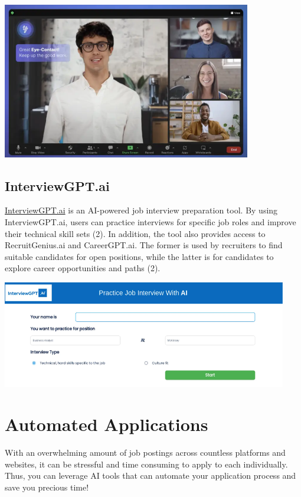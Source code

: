 \documentclass[
]{book}
\begin{document}
\includegraphics[width=4.28125in,height=\textheight]{yoodli pic 2.png}

\hypertarget{interviewgpt.ai}{%
\section{InterviewGPT.ai}\label{interviewgpt.ai}}

\href{https://interviewgpt.ai/}{InterviewGPT.ai} is an AI-powered job interview preparation tool. By using InterviewGPT.ai, users can practice interviews for specific job roles and improve their technical skill sets (2). In addition, the tool also provides access to RecruitGenius.ai and CareerGPT.ai. The former is used by recruiters to find suitable candidates for open positions, while the latter is for candidates to explore career opportunities and paths (2).

\includegraphics[width=4.90625in,height=\textheight]{intergptai pic.png}

\hypertarget{automated-applications}{%
\chapter{Automated Applications}\label{automated-applications}}

With an overwhelming amount of job postings across countless platforms and websites, it can be stressful and time consuming to apply to each individually. Thus, you can leverage AI tools that can automate your application process and save you precious time!
\end{document}
